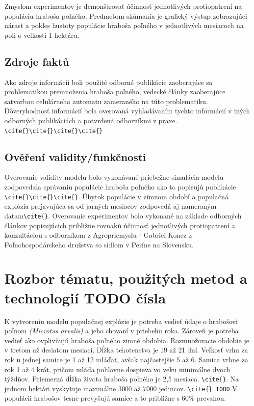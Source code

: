 \documentclass[a4paper,11pt]{article}
\begin{document}
Zmyslom experimentov je demonštrovať účinnosť jednotlivých protiopatrení na populáciu hraboša poľného. Predmetom skúmania je grafický výstup zobrazujúci nárast a pokles hustoty populácie hraboša poľného v jednotlivých mesiacoch na poli o veľkosti 1 hektáru.

\subsection{Zdroje faktů}
Ako zdroje informácií boli použité odborné publikácie zaoberajúce sa problematikou premnoženia hraboša poľného, vedecké články zaoberajúce satvorbou celulárneho automatu zameraného na túto problematiku. Dôveryhodnosť informácií bola overovaná vyhľadávaním tychto informácií v iných odborných publikáciách a potvrdená odborníkmi z praxe. \verb|\cite{}|\verb|\cite{}|\verb|\cite{}|\verb|\cite{}|

\subsection{Ověření validity/funkčnosti}
Overovanie validity modelu bolo vykonávané priebežne simulácia modelu zodpovedala správaniu populácie hraboša poľného ako to popisujú publikácie \verb|\cite{}|\verb|\cite{}|\verb|\cite{}|. Úbytok populácie v zimnom období a populačná explózia prejavujúca sa od jarných mesiacov zodpovedá aj nameraným datam\verb|\cite{}|. Overovanie experimentov bolo vykonané na základe odborných článkov popisujúcich približne rovnakú účinnosť jednotlivých protiopatrení a konzultáciou s odborníkom z Agropriemyslu - Gabriel Koncz z Poľnohospodárskeho družstva so sídlom v Períne na Slovensku.

\section{Rozbor tématu, použitých metod a technologií TODO čísla} 
K vytvoreniu modelu populačnej explózie je potreba vedieť údaje o hrabošovi poľnom \textit{(Microtus arvalis)} a jeho chovaní v priebehu roka. Zároveň je potreba vedieť ako ovplivňujú hraboša poľného zimné obdobia. Rozmnožovacie obdobie je v treťom až desiatom mesiaci. Dĺžka tehotenstva je 19 až 21 dní. Veľkosť vrhu za rok u jednej samice je 1 až 12 mláďat, avšak najčastejšie 5 až 6. Samica vrhne za rok 1 až 4 krát, pričom mláďa pohlavne dospieva vo veku minimálne dvoch týždňov. Priemerná dĺžka života hraboša poľného je 2,5 mesiaca. \verb|\cite{}|. Na jednom hektári vyskytuje maximálne 3000 až 7000 jedincov. \verb|\cite{} TODO| V populácii hrabošov tesne prevyšujú samice a to približne s 60\% prevahou. 
\end{document}

